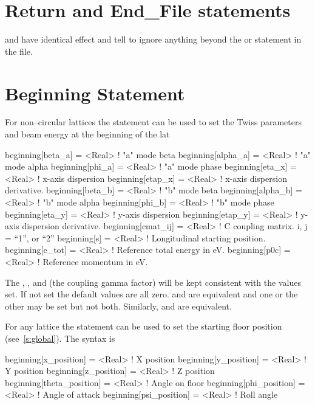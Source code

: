 \section{Return and End_File statements}

 and  have identical effect and tell \bmad to
ignore anything beyond the  or  statement in
the file.

\section{Beginning Statement}
\label{s:beginning}

For non--circular lattices the  statement can be used to
set the Twiss parameters and beam energy at the beginning of the lat
\begin{example}
  beginning[beta_a]  = <Real>  ! "a" mode beta
  beginning[alpha_a] = <Real>  ! "a" mode alpha
  beginning[phi_a]   = <Real>  ! "a" mode phase
  beginning[eta_x]   = <Real>  ! x-axis dispersion
  beginning[etap_x]  = <Real>  ! x-axis dispersion derivative.
  beginning[beta_b]  = <Real>  ! "b" mode beta
  beginning[alpha_b] = <Real>  ! "b" mode alpha
  beginning[phi_b]   = <Real>  ! "b" mode phase
  beginning[eta_y]   = <Real>  ! y-axis dispersion
  beginning[etap_y]  = <Real>  ! y-axis dispersion derivative.
  beginning[cmat_ij] = <Real>  ! C coupling matrix. i, j = {``1'', or ``2''} 
  beginning[s]       = <Real>  ! Longitudinal starting position.
  beginning[e_tot]   = <Real>  ! Reference total energy in eV.
  beginning[p0c]     = <Real>  ! Reference momentum in eV.
\end{example}
The , , and  (the coupling gamma
factor) will be kept consistent with the values set. If not set the
default values are all zero.   and
 are equivalent and one or the other may be
set but not both. Similarly,  and
 are equivalent.

For any lattice the  statement can be used to set the starting floor position 
(see~\ref{s:global}). The syntax is
\begin{example}
  beginning[x_position]     = <Real>  ! X position
  beginning[y_position]     = <Real>  ! Y position
  beginning[z_position]     = <Real>  ! Z position
  beginning[theta_position] = <Real>  ! Angle on floor
  beginning[phi_position]   = <Real>  ! Angle of attack
  beginning[psi_position]   = <Real>  ! Roll angle
\end{example}

